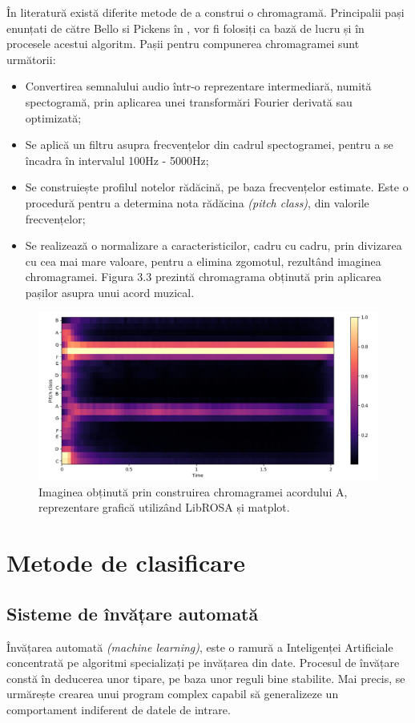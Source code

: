 \documentclass[a4paper,12pt]{report}
\begin{document}
În literatură există diferite metode de a construi o chromagramă. Principalii pași 
enunțati de către Bello si Pickens în \cite{Harmonic-content-in-music-signals},
vor fi folosiți ca bază de lucru și în procesele acestui algoritm. Pașii pentru compunerea 
chromagramei sunt următorii:
\begin{itemize}
    \setlength\itemsep{0.2em}
    \item Convertirea semnalului audio într-o reprezentare intermediară, numită spectogramă, 
    prin aplicarea unei transformări Fourier derivată sau optimizată;
    \item Se aplică un filtru asupra frecvențelor din cadrul spectogramei, pentru a se încadra în 
    intervalul 100Hz - 5000Hz;
    \item Se construiește profilul notelor rădăcină, pe baza frecvențelor estimate. Este o procedură pentru 
    a determina nota rădăcina \emph{(pitch class)}, din valorile frecvențelor;
    \item Se realizează o normalizare a caracteristicilor, cadru cu cadru, prin divizarea cu cea mai 
    mare valoare, pentru a elimina zgomotul, rezultând imaginea chromagramei. Figura 3.3 prezintă 
    chromagrama obținută prin aplicarea pașilor asupra unui acord muzical. 
\end{itemize}
\begin{figure}[h!]
    \centering
    \includegraphics[width=13.2cm]{..//resources//images//Chroma_Am.png} 
    \caption{Imaginea obținută prin construirea chromagramei acordului A, reprezentare grafică 
    utilizând LibROSA și matplot. }
    \label{fig:bits}
\end{figure}


\newpage
\chapter{Metode de clasificare}
\section{Sisteme de învățare automată}
Învățarea automată \emph{(machine learning)}, este o ramură a Inteligenței 
Artificiale concentrată pe algoritmi specializați pe invățarea din date. 
Procesul de învățare constă în deducerea unor tipare, pe baza unor reguli
bine stabilite. Mai precis, se urmărește crearea unui program complex capabil 
să generalizeze un comportament indiferent de datele de intrare. 
\end{document}
